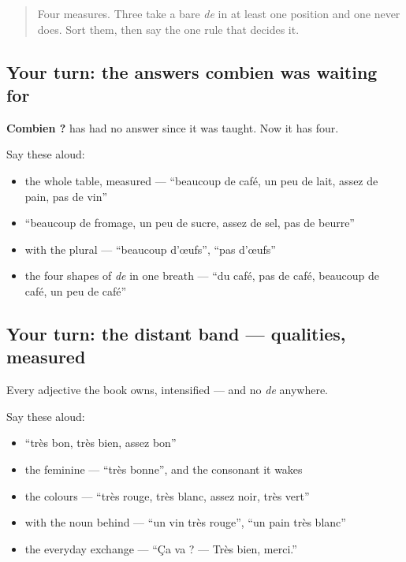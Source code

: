 \label{lesson:FR-R40-combien}



\begin{quote}
Four measures. Three take a bare \emph{de} in at least one position and one never does. Sort them, then say the one rule that decides it.
\end{quote}

\subsection*{Your turn: the answers combien was waiting for}
\textbf{Combien ?} has had no answer since it was taught. Now it has four.

Say these aloud:

\begin{itemize}
\raggedright
  \item the whole table, measured — \textquotedblleft{}beaucoup de café, un peu de lait, assez de pain, pas de vin\textquotedblright{}
  \item \textquotedblleft{}beaucoup de fromage, un peu de sucre, assez de sel, pas de beurre\textquotedblright{}
  \item with the plural — \textquotedblleft{}beaucoup d'œufs\textquotedblright{}, \textquotedblleft{}pas d'œufs\textquotedblright{}
  \item the four shapes of \emph{de} in one breath — \textquotedblleft{}du café, pas de café, beaucoup de café, un peu de café\textquotedblright{}
\end{itemize}

\subsection*{Your turn: the distant band — qualities, measured}
Every adjective the book owns, intensified — and no \emph{de} anywhere.

Say these aloud:

\begin{itemize}
\raggedright
  \item \textquotedblleft{}très bon, très bien, assez bon\textquotedblright{}
  \item the feminine — \textquotedblleft{}très bonne\textquotedblright{}, and the consonant it wakes
  \item the colours — \textquotedblleft{}très rouge, très blanc, assez noir, très vert\textquotedblright{}
  \item with the noun behind — \textquotedblleft{}un vin très rouge\textquotedblright{}, \textquotedblleft{}un pain très blanc\textquotedblright{}
  \item the everyday exchange — \textquotedblleft{}Ça va ? — Très bien, merci.\textquotedblright{}
\end{itemize}

